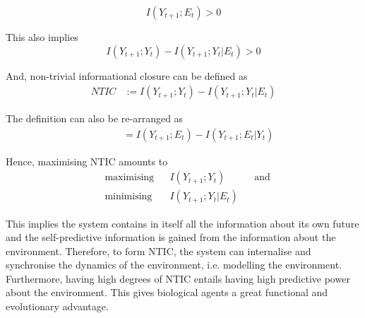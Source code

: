 \documentclass[utf8]{article}
\begin{document}
				\begin{equation}
				I(Y_{t+1};E_{t}) > 0
				\end{equation}

			\noindent
			This also implies
				\begin{equation}
					I(Y_{t+1};Y_{t})-I(Y_{t+1};Y_{t}|E_{t}) > 0
				\end{equation}



			\noindent
			And, non-trivial informational closure can be defined as
				\begin{equation}
				\label{eq:NTIC}
    				\left.\begin{array}
    				{rl}{NTIC} & {:=I(Y_{t+1};Y_{t})-I(Y_{t+1};Y_{t}|E_{t})}
    				\end{array} \right.
				\end{equation}
				
				
			\noindent
            The definition can also be re-arranged as 
				\begin{equation}
				\label{eq:NTIC2}
    				\left.\begin{array}
    				{rl}{\qquad} & {\ =I(Y_{t+1};E_{t})-I(Y_{t+1};E_{t}|Y_{t})}
    				\end{array} \right.
				\end{equation}				

			\noindent
			Hence, maximising NTIC amounts to
				\begin{equation}
    				\label{eq:nticObjective}
    				\begin{aligned}
    				& \text{maximising} & { } & I(Y_{t+1};Y_{t}) & { } & \text{and} \\
    				& \text{minimising} & { } & I(Y_{t+1};Y_{t}|E_{t}) & { }
    				\end{aligned}
				\end{equation}

			\noindent
			This implies the system contains in itself all the information about its own future and the self-predictive information is gained from the information about the environment. Therefore, to form NTIC, the system can internalise and synchronise the dynamics of the environment, i.e. modelling the environment. Furthermore, having high degrees of NTIC entails having high predictive power about the environment. This gives biological agents a great functional and evolutionary advantage. 
			
\end{document}
